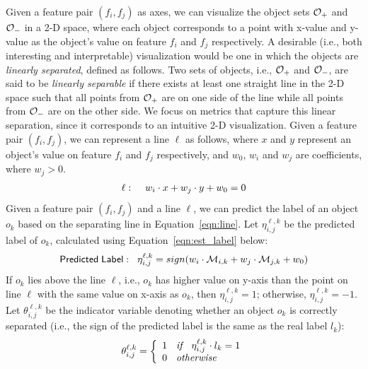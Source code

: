 Given a feature pair $(f_i,f_j)$ as axes, we can visualize the object sets ${\mathcal{O}}_+$ and ${\mathcal{O}}_-$ in a 2-D space, where each object corresponds to a point with x-value and y-value as the object's value on feature $f_i$ and $f_j$ respectively. A desirable (i.e., both interesting and interpretable) visualization would be one in which the objects are {\em linearly separated}, defined as follows. Two sets of objects, i.e., ${\mathcal{O}}_+$ and ${\mathcal{O}}_-$, are said to be \emph{linearly separable} if there exists at least one straight line in the 2-D space such that all points from ${\mathcal{O}}_+$ are on one side of the line while all points from ${\mathcal{O}}_-$ are on the other side.
We focus on metrics that capture this linear separation, since it corresponds to an intuitive 2-D visualization.
Given a feature pair $(f_i,f_j)$, we can represent a line $\ell$ as follows, where $x$ and $y$ represent an object's value on feature $f_i$ and $f_j$ respectively, and $w_0$, $w_i$ and $w_j$ are coefficients, where $w_j>0$.
\begin{equation}\label{eqn:line}
\begin{split}
\ell: \hspace{4mm} w_i\cdot x + w_j\cdot y +w_0 =0
\end{split}
\end{equation}
Given a feature pair $(f_i,f_j)$ and a line $\ell$, we can predict the label of an object $o_k$ based on the separating line in Equation~\ref{eqn:line}. Let $\eta_{i,j}^{\ell,k}$ be the predicted label of $o_k$, calculated using Equation~\ref{eqn:est_label} below:
\begin{equation}\label{eqn:est_label}
{\sf Predicted \hspace{1mm} Label:}\hspace{3mm} \eta_{i,j}^{\ell,k}=sign(w_i\cdot {\mathcal{M}}_{i,k} + w_j\cdot {\mathcal{M}}_{j,k} +w_0)
\end{equation}
\noindent If $o_k$ lies above the line $\ell$, i.e., $o_k$ has higher value on y-axis than the point on line $\ell$ with the same value on x-axis as $o_k$, then $\eta_{i,j}^{\ell,k}=1$; otherwise, $\eta_{i,j}^{\ell,k}=-1$. Let $\theta_{i,j}^{\ell,k}$ be the indicator variable denoting whether an object $o_k$ is correctly separated (i.e., the sign of the predicted label is the same as the real label $l_k$):
\begin{equation}\label{eqn:s_object}
\theta_{i,j}^{\ell,k}=\left\{
 \begin{array}{ll}
  1 \textit{\hspace{2mm} if \hspace{2mm}} \eta_{i,j}^{\ell,k}\cdot l_k = 1\\
  0 \textit{\hspace{2mm} otherwise \hspace{2mm}}
 \end{array}
 \right.
\end{equation}

